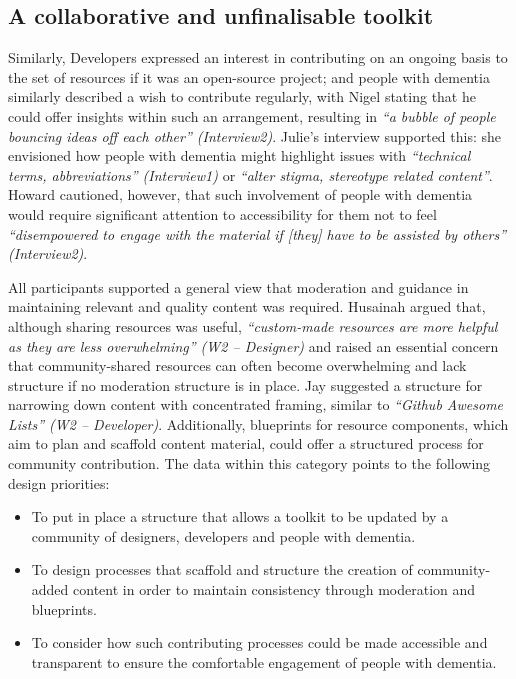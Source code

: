 \subsection{A collaborative and unfinalisable toolkit}
 Similarly, Developers expressed an interest in contributing on an ongoing basis to the set of resources if it was an open-source project; and people with dementia similarly described a wish to contribute regularly, with Nigel stating that he could offer insights within such an arrangement, resulting in \textit{``a bubble of people bouncing ideas off each other'' (Interview2)}. Julie’s interview supported this: she envisioned how people with dementia might highlight issues with \textit{``technical terms, abbreviations'' (Interview1)} or \textit{``alter stigma, stereotype related content''}. Howard cautioned, however, that such involvement of people with dementia would require significant attention to accessibility for them not to feel \textit{``disempowered to engage with the material if [they] have to be assisted by others'' (Interview2)}. 

All participants supported a general view that moderation and guidance in maintaining relevant and quality content was required. Husainah argued that, although sharing resources was useful, \textit{``custom-made resources are more helpful as they are less overwhelming'' (W2 – Designer)} and raised an essential concern that community-shared resources can often become overwhelming and lack structure if no moderation structure is in place. Jay suggested a structure for narrowing down content with concentrated framing, similar to \textit{``Github Awesome Lists'' (W2 – Developer)}. Additionally, blueprints for resource components, which aim to plan and scaffold content material, could offer a structured process for community contribution. The data within this category points to the following design priorities:

\begin{itemize}
\item To put in place a structure that allows a toolkit to be updated by a community of designers, developers and people with dementia.
\item To design processes that scaffold and structure the creation of community-added content in order to maintain consistency through moderation and blueprints.
\item To consider how such contributing processes could be made accessible and transparent to ensure the comfortable engagement of people with dementia.
\end{itemize}


